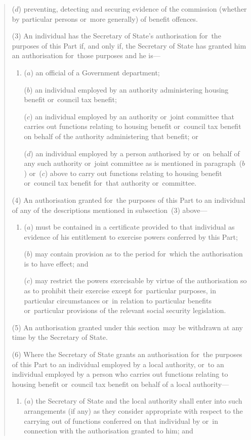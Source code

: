 \documentclass[12pt,a4paper]{article}
\begin{document}
\begin{quotation}
\begin{enumerate}
($d$) preventing, detecting and securing evidence of the commission (whether by particular persons or~more generally) of benefit offences.
\end{enumerate}

(3) An individual has the Secretary of State’s authorisation for~the purposes of this Part if, and only if, the Secretary of State has granted him an authorisation for~those purposes and he is—
\begin{enumerate}\item[]
($a$) an official of a Government department;

($b$) an individual employed by an authority administering housing benefit or~council tax benefit;

($c$) an individual employed by an authority or~joint committee that carries out functions relating to housing benefit or~council tax benefit on behalf of the authority administering that benefit; or

($d$) an individual employed by a person authorised by or~on behalf of any such authority or~joint committee as is mentioned in paragraph~($b$)  or~($c$)  above to carry out functions relating to housing benefit or~council tax benefit for~that authority or~committee.
\end{enumerate}

(4) An authorisation granted for~the purposes of this Part to an individual of any of the descriptions mentioned in subsection~(3)  above—
\begin{enumerate}\item[]
($a$) must be contained in a certificate provided to that individual as evidence of his entitlement to exercise powers conferred by this Part;

($b$) may contain provision as to the period for~which the authorisation is to have effect; and

($c$) may restrict the powers exercisable by virtue of the authorisation so as to prohibit their exercise except for~particular purposes, in particular circumstances or~in relation to particular benefits or~particular provisions of the relevant social security legislation.
\end{enumerate}

(5) An authorisation granted under this section~may be withdrawn at any time by the Secretary of State.

(6) Where the Secretary of State grants an authorisation for~the purposes of this Part to an individual employed by a local authority, or~to an individual employed by a person who carries out functions relating to housing benefit or~council tax benefit on behalf of a local authority—
\begin{enumerate}\item[]
($a$) the Secretary of State and the local authority shall enter into such arrangements (if any) as they consider appropriate with respect to the carrying out of functions conferred on that individual by or~in connection with the authorisation granted to him; and


\end{enumerate}
\end{quotation}
\end{document}

